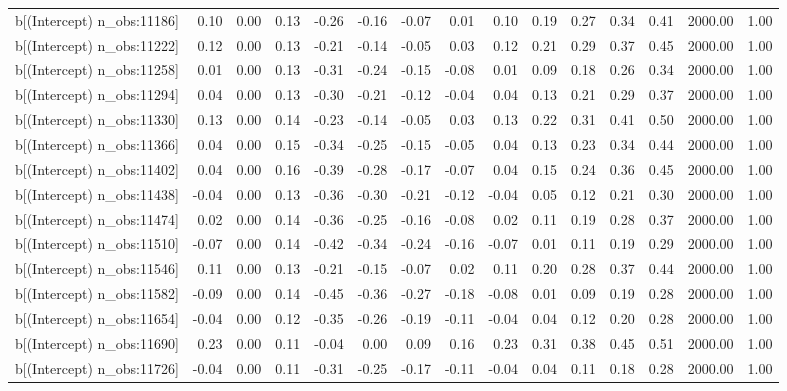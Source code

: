 \begin{table}[ht]
\begin{tabular}{rrrrrrrrrrrrrrr}
  b[(Intercept) n\_obs:11186] & 0.10 & 0.00 & 0.13 & -0.26 & -0.16 & -0.07 & 0.01 & 0.10 & 0.19 & 0.27 & 0.34 & 0.41 & 2000.00 & 1.00 \\ 
  b[(Intercept) n\_obs:11222] & 0.12 & 0.00 & 0.13 & -0.21 & -0.14 & -0.05 & 0.03 & 0.12 & 0.21 & 0.29 & 0.37 & 0.45 & 2000.00 & 1.00 \\ 
  b[(Intercept) n\_obs:11258] & 0.01 & 0.00 & 0.13 & -0.31 & -0.24 & -0.15 & -0.08 & 0.01 & 0.09 & 0.18 & 0.26 & 0.34 & 2000.00 & 1.00 \\ 
  b[(Intercept) n\_obs:11294] & 0.04 & 0.00 & 0.13 & -0.30 & -0.21 & -0.12 & -0.04 & 0.04 & 0.13 & 0.21 & 0.29 & 0.37 & 2000.00 & 1.00 \\ 
  b[(Intercept) n\_obs:11330] & 0.13 & 0.00 & 0.14 & -0.23 & -0.14 & -0.05 & 0.03 & 0.13 & 0.22 & 0.31 & 0.41 & 0.50 & 2000.00 & 1.00 \\ 
  b[(Intercept) n\_obs:11366] & 0.04 & 0.00 & 0.15 & -0.34 & -0.25 & -0.15 & -0.05 & 0.04 & 0.13 & 0.23 & 0.34 & 0.44 & 2000.00 & 1.00 \\ 
  b[(Intercept) n\_obs:11402] & 0.04 & 0.00 & 0.16 & -0.39 & -0.28 & -0.17 & -0.07 & 0.04 & 0.15 & 0.24 & 0.36 & 0.45 & 2000.00 & 1.00 \\ 
  b[(Intercept) n\_obs:11438] & -0.04 & 0.00 & 0.13 & -0.36 & -0.30 & -0.21 & -0.12 & -0.04 & 0.05 & 0.12 & 0.21 & 0.30 & 2000.00 & 1.00 \\ 
  b[(Intercept) n\_obs:11474] & 0.02 & 0.00 & 0.14 & -0.36 & -0.25 & -0.16 & -0.08 & 0.02 & 0.11 & 0.19 & 0.28 & 0.37 & 2000.00 & 1.00 \\ 
  b[(Intercept) n\_obs:11510] & -0.07 & 0.00 & 0.14 & -0.42 & -0.34 & -0.24 & -0.16 & -0.07 & 0.01 & 0.11 & 0.19 & 0.29 & 2000.00 & 1.00 \\ 
  b[(Intercept) n\_obs:11546] & 0.11 & 0.00 & 0.13 & -0.21 & -0.15 & -0.07 & 0.02 & 0.11 & 0.20 & 0.28 & 0.37 & 0.44 & 2000.00 & 1.00 \\ 
  b[(Intercept) n\_obs:11582] & -0.09 & 0.00 & 0.14 & -0.45 & -0.36 & -0.27 & -0.18 & -0.08 & 0.01 & 0.09 & 0.19 & 0.28 & 2000.00 & 1.00 \\ 
  b[(Intercept) n\_obs:11654] & -0.04 & 0.00 & 0.12 & -0.35 & -0.26 & -0.19 & -0.11 & -0.04 & 0.04 & 0.12 & 0.20 & 0.28 & 2000.00 & 1.00 \\ 
  b[(Intercept) n\_obs:11690] & 0.23 & 0.00 & 0.11 & -0.04 & 0.00 & 0.09 & 0.16 & 0.23 & 0.31 & 0.38 & 0.45 & 0.51 & 2000.00 & 1.00 \\ 
  b[(Intercept) n\_obs:11726] & -0.04 & 0.00 & 0.11 & -0.31 & -0.25 & -0.17 & -0.11 & -0.04 & 0.04 & 0.11 & 0.18 & 0.28 & 2000.00 & 1.00 \\ 

\end{tabular}
\end{table}
